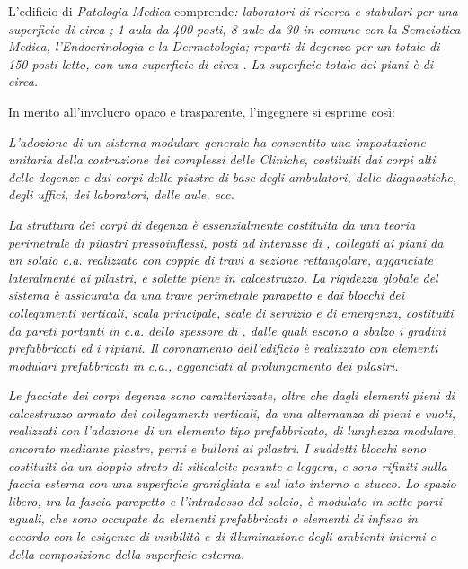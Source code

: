 \vspace{0.5em}

L'edificio di \emph{Patologia Medica} comprende\emph{: laboratori di ricerca e stabulari per una superficie di circa ; 1 aula da \num{400} posti, \num{8} aule da \num{30} in comune con la Semeiotica Medica, l'Endocrinologia e la Dermatologia; reparti di degenza per un totale di \num{150} posti-letto, con una superficie di circa . La superficie totale dei piani è di  circa.}

\vspace{0.5em}
\noindent In merito all'involucro opaco e trasparente, l'ingegnere si esprime così:

\vspace{0.5em}

\emph{L'adozione di un sistema modulare generale ha consentito una impostazione unitaria della costruzione dei complessi delle Cliniche, costituiti dai corpi alti delle degenze e dai corpi delle piastre di base degli ambulatori, delle diagnostiche, degli uffici, dei laboratori, delle aule, ecc.}

\emph{La struttura dei corpi di degenza è essenzialmente costituita da una teoria perimetrale di pilastri pressoinflessi, posti ad interasse di , collegati ai piani da un solaio c.a. realizzato con coppie di travi a sezione rettangolare, agganciate lateralmente ai pilastri, e solette piene in calcestruzzo. La rigidezza globale del sistema è assicurata da una trave perimetrale parapetto e dai blocchi dei collegamenti verticali, scala principale, scale di servizio e di emergenza, costituiti da pareti portanti in c.a. dello spessore di , dalle quali escono a sbalzo i gradini prefabbricati ed i ripiani. Il coronamento dell'edificio è realizzato con elementi modulari prefabbricati in c.a., agganciati al prolungamento dei pilastri.}

\sdots

\emph{Le facciate dei corpi degenza sono caratterizzate, oltre che dagli elementi pieni di calcestruzzo armato dei collegamenti verticali, da una alternanza di pieni e vuoti, realizzati con l'adozione di un elemento tipo prefabbricato, di lunghezza modulare, ancorato mediante piastre, perni e bulloni ai pilastri. I suddetti blocchi sono costituiti da un doppio strato di silicalcite pesante e leggera, e sono rifiniti sulla faccia esterna con una superficie granigliata e sul lato interno a stucco. Lo spazio libero, tra la fascia parapetto e l'intradosso del solaio, è modulato in sette parti uguali, che sono occupate da elementi prefabbricati o elementi di infisso in accordo con le esigenze di visibilità e di illuminazione degli ambienti interni e della composizione della superficie esterna.}

